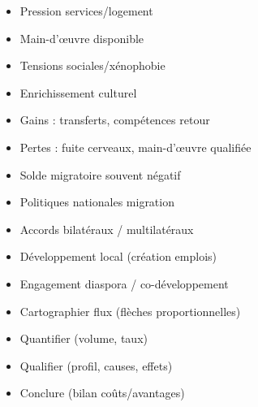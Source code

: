 \documentclass[11pt]{article}
\begin{document}
\begin{popfigure}
\begin{tcbraster}[raster columns=3,raster equal height=rows,raster column skip=6pt,raster row skip=6pt,enhanced,blankest]
\begin{tcolorbox}
\begin{itemize}[nosep,leftmargin=*,itemsep=1pt,font=\scriptsize]
\item Pression services/logement
\item Main-d'œuvre disponible
\item Tensions sociales/xénophobie
\item Enrichissement culturel
\end{itemize}
\end{tcolorbox}
\begin{tcolorbox}[enhanced,colback=white,colframe=poppurple,boxrule=0.9pt,arc=3pt,title={4. Migrations int. : Cameroun},fonttitle=\bfseries\scriptsize,coltitle=white,colbacktitle=poppurple,left=4pt,right=4pt,top=2pt,bottom=2pt,boxsep=1pt,toptitle=1.5pt,bottomtitle=1.5pt,halign=left]
\begin{itemize}[nosep,leftmargin=*,itemsep=1pt,font=\scriptsize]
\item Gains : transferts, compétences retour
\item Pertes : fuite cerveaux, main-d'œuvre qualifiée
\item Solde migratoire souvent négatif
\end{itemize}
\end{tcolorbox}
\begin{tcolorbox}[enhanced,colback=white,colframe=poppink,boxrule=0.9pt,arc=3pt,title={5. Tentatives de règlement},fonttitle=\bfseries\scriptsize,coltitle=white,colbacktitle=poppink,left=4pt,right=4pt,top=2pt,bottom=2pt,boxsep=1pt,toptitle=1.5pt,bottomtitle=1.5pt,halign=left]
\begin{itemize}[nosep,leftmargin=*,itemsep=1pt,font=\scriptsize]
\item Politiques nationales migration
\item Accords bilatéraux / multilatéraux
\item Développement local (création emplois)
\item Engagement diaspora / co-développement
\end{itemize}
\end{tcolorbox}
\begin{tcolorbox}[enhanced,colback=white,colframe=popgold,boxrule=0.9pt,arc=3pt,title={6. Méthode d'analyse (TP)},fonttitle=\bfseries\scriptsize,coltitle=white,colbacktitle=popgold,left=4pt,right=4pt,top=2pt,bottom=2pt,boxsep=1pt,toptitle=1.5pt,bottomtitle=1.5pt,halign=left]
\begin{itemize}[nosep,leftmargin=*,itemsep=1pt,font=\scriptsize]
\item Cartographier flux (flèches proportionnelles)
\item Quantifier (volume, taux)
\item Qualifier (profil, causes, effets)
\item Conclure (bilan coûts/avantages)
\end{itemize}
\end{tcolorbox}
\end{tcbraster}


\end{popfigure}
\end{document}
